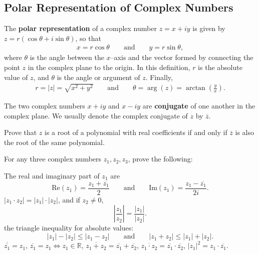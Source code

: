 \subsection{Polar Representation of Complex Numbers}
\begin{tcolorbox}[title={Complex Conjugate Definitions}]
\begin{definition}
    The \textbf{polar representation} of a complex number $z=x+iy$ is given by $z=r(\cos\theta+i\sin\theta)$, so that
    \begin{align*}
        x = r \cos \theta \qquad \text{and} \qquad y = r \sin \theta,
    \end{align*}
    where $\theta$ is the angle between the $x$--axis and the vector formed by connecting the point $z$ in the complex plane to the origin. In this definition, $r$ is the absolute value of $z$, and $\theta$ is the angle or argument of $z$. Finally,
    \begin{align*}
        r= |z| = \sqrt{x^2+y^2}\qquad \text{and} \qquad \theta=\arg(z)=\arctan\left(\frac{y}{x}\right).
    \end{align*}
\end{definition}

\begin{definition}
    The two complex numbers $x+iy$ and $x-iy$ are \textbf{conjugate} of one another in the complex plane. We usually denote the complex conjugate of $z$ by $\overline{z}$.
\end{definition}
\end{tcolorbox}


\begin{theorem}
Prove that $z$ is a root of a polynomial with real coefficients if and only if $\overline{z}$ is also the root of the same polynomial.
\end{theorem}


\begin{theorem}
    For any three complex numbers $z_1,z_2,z_3$, prove the following:
    \begin{tasks}
        \task The real and imaginary part of $z_1$ are
        \[\text{Re}(z_1)=\frac{z_1+\overline{z_1}}{2} \qquad \text{and} \qquad \text{Im}(z_1)=\frac{z_1-\overline{z_1}}{2i}.\]
        \task $|z_1\cdot z_2|  = |z_1| \cdot |z_2|$, and if $z_2\neq 0$,
        \[\left|\frac{z_1}{z_2}\right|=\frac{|z_1|}{|z_2|}.\]
        \task the triangle inequality for absolute values:
        \[|z_1|-|z_2| \leq |z_1-z_2| \qquad \text{and} \qquad |z_1+z_2| \leq |z_1|+|z_2|.\]
        \task $\overline{\overline{z_1}}=z_1$,
        \task $\overline{z_1}=z_1 \iff z_1 \in \mathbb R$,
        \task $\overline{z_1+z_2} = \overline{z_1}+\overline{z_2}$,
        \task $\overline{z_1\cdot z_2} = \overline{z_1}\cdot \overline{z_2}$,
        \task $|z_1|^2 = z_1\cdot \overline{z_1}$.
    \end{tasks}
\end{theorem}

